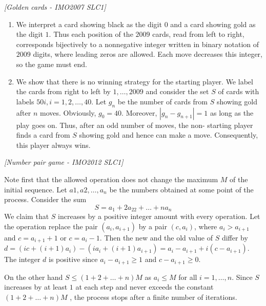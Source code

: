 \begin{problem}
\textit{[Golden cards - IMO2007 SLC1]}

\begin{enumerate}
\item We interpret a card showing black as the digit $0$ and a card showing gold as the digit $1$. Thus each position of the $2009$ cards, read from left to right, corresponds bijectively to a nonnegative integer written in binary notation of $2009$ digits, where leading zeros are allowed. Each move decreases this integer, so the game must end.
\item We show that there is no winning strategy for the starting player. We label the cards from right to left by $1, \dots , 2009$ and consider the set $S$ of cards with labels $50i, i = 1, 2, \dots , 40$. Let $g_n$ be the number of cards from $S$ showing gold after $n$ moves. Obviously, $g_0 = 40$. Moreover, $|g_n − g_{n+1}| = 1$ as long as the play goes on. Thus, after an odd number of moves, the non- starting player ﬁnds a card from $S$ showing gold and hence can make a move. Consequently, this player always wins. 

\end{enumerate}
\end{problem}
%

\begin{problem}
\textit{[Number pair game - IMO2012 SLC1]}

Note ﬁrst that the allowed operation does not change the maximum $M$ of the initial sequence. Let $a1, a2, \dots , a_n$ be the numbers obtained at some point of the process. Consider the sum
$$S  =  a_1 + 2a_22 + \dots + na_n$$
We claim that $S$ increases by a positive integer amount with every operation. Let the operation replace the pair $(a_i, a_{i+1})$ by a pair $(c, a_i)$, where $a_i > a_{i+1}$ and $c = a_{i+1}+1$ or $c = a_i −1$. Then the new and the old value of $S$ diﬀer by $d = (ic+(i+1)a_i)−(ia_i +(i+1)a_{i+1}) = a_i −a_{i+1}+i(c−a_{i+1})$. The integer $d$ is positive since $a_i − a_{i+1} ≥ 1$ and $c − a_{i+1} \ge 0$.

On the other hand $S \le (1 + 2 + \dots + n)M$ as $a_i \le M$ for all $i = 1, \dots , n$. Since $S$ increases by at least $1$ at each step and never exceeds the constant $(1 + 2 + \dots + n)M$ , the process stops after a ﬁnite number of iterations.
\end{problem}
%


